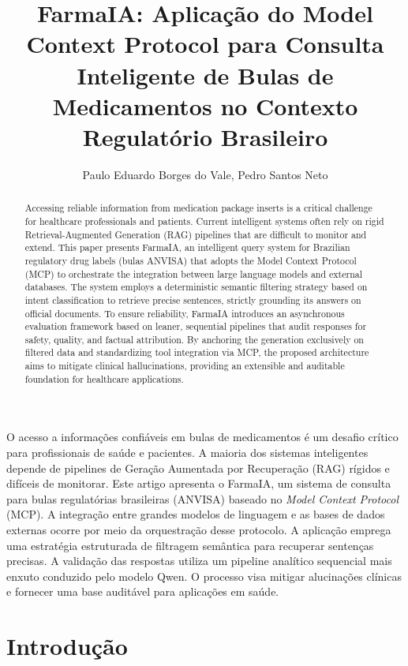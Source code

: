 \documentclass[12pt]{article}
\title{FarmaIA: Aplicação do Model Context Protocol para Consulta Inteligente de Bulas de Medicamentos no Contexto Regulatório Brasileiro}
\author{Paulo Eduardo Borges do Vale\inst{1}, Pedro Santos Neto\inst{1}}
\begin{document}
\maketitle

\begin{abstract}
Accessing reliable information from medication package inserts is a critical challenge for healthcare professionals and patients. Current intelligent systems often rely on rigid Retrieval-Augmented Generation (RAG) pipelines that are difficult to monitor and extend. This paper presents FarmaIA, an intelligent query system for Brazilian regulatory drug labels (bulas ANVISA) that adopts the Model Context Protocol (MCP) to orchestrate the integration between large language models and external databases. The system employs a deterministic semantic filtering strategy based on intent classification to retrieve precise sentences, strictly grounding its answers on official documents. To ensure reliability, FarmaIA introduces an asynchronous evaluation framework based on leaner, sequential pipelines that audit responses for safety, quality, and factual attribution. By anchoring the generation exclusively on filtered data and standardizing tool integration via MCP, the proposed architecture aims to mitigate clinical hallucinations, providing an extensible and auditable foundation for healthcare applications.
\end{abstract}

\begin{resumo}
O acesso a informações confiáveis em bulas de medicamentos é um desafio crítico para profissionais de saúde e pacientes. A maioria dos sistemas inteligentes depende de pipelines de Geração Aumentada por Recuperação (RAG) rígidos e difíceis de monitorar. Este artigo apresenta o FarmaIA, um sistema de consulta para bulas regulatórias brasileiras (ANVISA) baseado no \textit{Model Context Protocol} (MCP). A integração entre grandes modelos de linguagem e as bases de dados externas ocorre por meio da orquestração desse protocolo. A aplicação emprega uma estratégia estruturada de filtragem semântica para recuperar sentenças precisas. A validação das respostas utiliza um pipeline analítico sequencial mais enxuto conduzido pelo modelo Qwen. O processo visa mitigar alucinações clínicas \cite{ji2023survey} e fornecer uma base auditável para aplicações em saúde.
\end{resumo}

\section{Introdução}
\label{sec:introducao}
\end{document}
